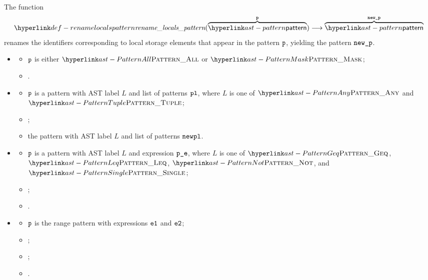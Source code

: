 \hypertarget{def-renamelocalspattern}{}
The function
\[
\renamelocalspattern(\overname{\pattern}{\vp}) \aslto \overname{\pattern}{\newp}
\]
renames the identifiers corresponding to local storage elements that appear in the
pattern $\vp$, yielding the pattern $\newp$.

\ProseParagraph
\OneApplies
\begin{itemize}
  \item {}
  \begin{itemize}
    \item $\vp$ is either $\PatternAll$ or $\PatternMask$;
    \item \Proseeqdef{$\newp$}{$\vp$}.
  \end{itemize}

  \item {}
  \begin{itemize}
    \item $\vp$ is a pattern with AST label $L$ and list of patterns $\texttt{pl}$,
          where $L$ is one of $\PatternAny$ and $\PatternTuple$;
    \item {};
    \item the pattern with AST label $L$ and list of patterns $\texttt{newpl}$.
  \end{itemize}

  \item {}
  \begin{itemize}
    \item $\vp$ is a pattern with AST label $L$ and expression $\texttt{p\_e}$,
          where $L$ is one of $\PatternGeq$, $\PatternLeq$, $\PatternNot$, and
          $\PatternSingle$;
    \item \Proserenamelocalsexpr{$\veone$}{$\veonep$};
    \item {}.
  \end{itemize}

  \item {}
  \begin{itemize}
    \item $\vp$ is the range pattern with expressions $\veone$ and $\vetwo$;
    \item \Proserenamelocalsexpr{$\veone$}{$\veonep$};
    \item \Proserenamelocalsexpr{$\vetwo$}{$\vetwop$};
    \item {}.
  \end{itemize}
\end{itemize}

